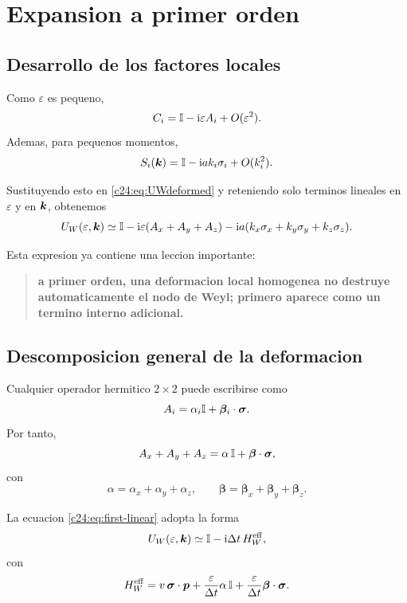 \section{Expansion a primer orden}
\subsection{Desarrollo de los factores locales}
Como \(\varepsilon\) es pequeno,
\begin{equation}
C_i = \mathbb{I} - \mathrm{i}\varepsilon A_i + O(\varepsilon^2).
\end{equation}
Ademas, para pequenos momentos,
\begin{equation}
S_i(\bm{k})=\mathbb{I}-\mathrm{i} a k_i \sigma_i + O(k_i^2).
\end{equation}

Sustituyendo esto en \eqref{c24:eq:UWdeformed} y reteniendo solo terminos lineales en \(\varepsilon\) y en \(\bm{k}\), obtenemos
\begin{equation}
U_W(\varepsilon,\bm{k})
\simeq
\mathbb{I}
-\mathrm{i}\varepsilon(A_x+A_y+A_z)
-\mathrm{i} a(k_x\sigma_x+k_y\sigma_y+k_z\sigma_z).
\label{c24:eq:first-linear}
\end{equation}

Esta expresion ya contiene una leccion importante:
\begin{quote}
\textbf{a primer orden, una deformacion local homogenea no destruye automaticamente el nodo de Weyl; primero aparece como un termino interno adicional.}
\end{quote}

\subsection{Descomposicion general de la deformacion}
Cualquier operador hermitico \(2\times 2\) puede escribirse como
\begin{equation}
A_i = \alpha_i \mathbb{I} + \bm{\beta}_i\cdot\bm{\sigma}.
\end{equation}
Por tanto,
\begin{equation}
A_x+A_y+A_z
=
\alpha\,\mathbb{I}+\bm{\beta}\cdot\bm{\sigma},
\end{equation}
con
\begin{equation}
\alpha=\alpha_x+\alpha_y+\alpha_z,
\qquad
\bm{\beta}=\bm{\beta}_x+\bm{\beta}_y+\bm{\beta}_z.
\end{equation}

La ecuacion \eqref{c24:eq:first-linear} adopta la forma
\begin{equation}
U_W(\varepsilon,\bm{k})
\simeq
\mathbb{I}-\mathrm{i}\Delta t\,H_W^{\mathrm{eff}},
\end{equation}
con
\begin{equation}
H_W^{\mathrm{eff}}
=
v\,\bm{\sigma}\cdot\bm{p}
+ \frac{\varepsilon}{\Delta t}\alpha\,\mathbb{I}
+ \frac{\varepsilon}{\Delta t}\bm{\beta}\cdot\bm{\sigma}.
\label{c24:eq:HeffWeyl1}
\end{equation}

